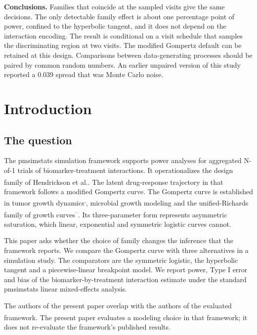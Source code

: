 \documentclass[
  11pt,
]{article}
\begin{document}
\textbf{Conclusions.} Families that coincide at the sampled visits give the
same decisions. The only detectable family effect is about one
percentage point of power, confined to the hyperbolic tangent, and it
does not depend on the interaction encoding. The result is conditional
on a visit schedule that samples the discriminating region at two
visits. The modified Gompertz default can be retained at this design.
Comparisons between data-generating processes should be paired by
common random numbers. An earlier unpaired version of this study
reported a 0.039 spread that was Monte Carlo noise.

\section{Introduction}\label{introduction}

\subsection{The question}\label{the-question}

The pmsimstats simulation framework supports power analyses for
aggregated N-of-1 trials of biomarker-treatment interactions. It
operationalizes the design family of Hendrickson et al.\textsuperscript{}. The latent drug-response trajectory in that
framework follows a modified Gompertz curve. The Gompertz curve is
established in tumor growth dynamics\textsuperscript{,}, microbial growth modeling\textsuperscript{} and the unified-Richards family of growth
curves\textsuperscript{--}. Its
three-parameter form represents asymmetric saturation, which linear,
exponential and symmetric logistic curves cannot.

This paper asks whether the choice of family changes the inference
that the framework reports. We compare the Gompertz curve with three
alternatives in a simulation study. The comparators are the symmetric
logistic, the hyperbolic tangent and a piecewise-linear breakpoint
model. We report power, Type I error and bias of the
biomarker-by-treatment interaction estimate under the standard
pmsimstats linear mixed-effects analysis.

The authors of the present paper overlap with the authors of the
evaluated framework\textsuperscript{}. The present paper evaluates a
modeling choice in that framework; it does not re-evaluate the
framework's published results.
\end{document}
